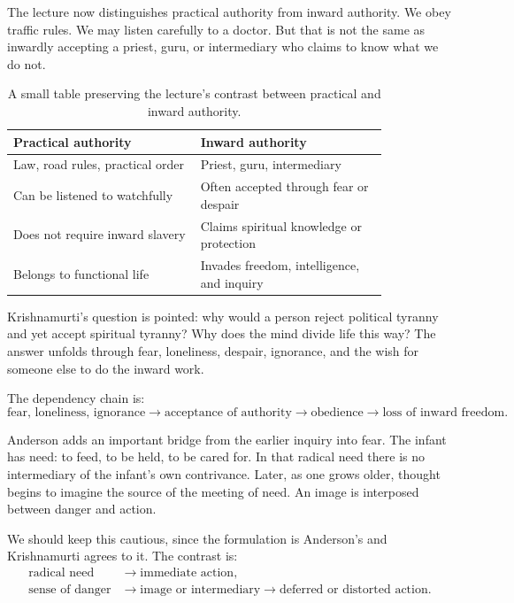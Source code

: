 The lecture now distinguishes practical authority from inward authority. We obey traffic rules. We may listen carefully to a doctor. But that is not the same as inwardly accepting a priest, guru, or intermediary who claims to know what we do not.

\begin{table}
\centering
\begin{tabular}{p{0.42\linewidth} p{0.42\linewidth}}
\hline
Practical authority & Inward authority \\
\hline
Law, road rules, practical order & Priest, guru, intermediary \\
Can be listened to watchfully & Often accepted through fear or despair \\
Does not require inward slavery & Claims spiritual knowledge or protection \\
Belongs to functional life & Invades freedom, intelligence, and inquiry \\
\hline
\end{tabular}
\caption{A small table preserving the lecture's contrast between practical and inward authority.}
\end{table}

Krishnamurti's question is pointed: why would a person reject political tyranny and yet accept spiritual tyranny? Why does the mind divide life this way? The answer unfolds through fear, loneliness, despair, ignorance, and the wish for someone else to do the inward work.

The dependency chain is:
\begin{equation}
\text{fear, loneliness, ignorance}
\longrightarrow
\text{acceptance of authority}
\longrightarrow
\text{obedience}
\longrightarrow
\text{loss of inward freedom}.
\end{equation}

Anderson adds an important bridge from the earlier inquiry into fear. The infant has need: to feed, to be held, to be cared for. In that radical need there is no intermediary of the infant's own contrivance. Later, as one grows older, thought begins to imagine the source of the meeting of need. An image is interposed between danger and action.

We should keep this cautious, since the formulation is Anderson's and Krishnamurti agrees to it. The contrast is:
\begin{align}
\text{radical need}
&\longrightarrow
\text{immediate action},\\
\text{sense of danger}
&\longrightarrow
\text{image or intermediary}
\longrightarrow
\text{deferred or distorted action}.
\end{align}

